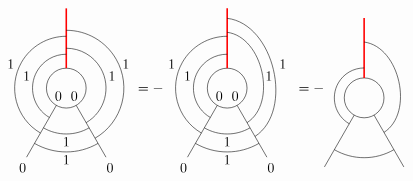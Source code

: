	\begin{equation*}
		\begin{tikzpicture}[scale=1,baseline=(current bounding box.center)]
			\draw (0,0) circle (0.5cm);
			\draw
			\foreach \a in {-60, -120} {
				(\a:0.5) -- (\a:2)
			};
			\draw[red,line width=0.4mm] (90:0.5) -- (90:2);
			\draw ([shift=(-60:1cm)]0,0) arc (-60:90:1cm);
			\draw ([shift=(-120:1.15cm)]0,0) arc (-120:-60:1.15cm);
			\draw ([shift=(240:0.85cm)]0,0) arc (240:90:0.85cm);
			\draw ([shift=(240:1.3cm)]0,0) arc (240:90:1.3cm);
			\draw ([shift=(-60:1.45cm)]0,0) arc (-60:90:1.45cm);
			\draw ([shift=(-120:1.6cm)]0,0) arc (-120:-60:1.6cm);
			\node at (0.2,-0.2) {$0$};
			\node at (-0.2,-0.2) {$0$};
			\node at (-1.1,-2) {$0$};
			\node at (1.1,-2) {$0$};
			\node at (-1,0.3) {$1$};
			\node at (1.15,0.3) {$1$};
			\node at (0,-1.35) {$1$};
			\node at (-1.4,0.6) {$1$};
			\node at (1.5,0.6) {$1$};
			\node at (0,-1.8) {$1$};
		\end{tikzpicture}
		=-\begin{tikzpicture}[scale=1,baseline=(current bounding box.center)]
			\draw (0,0) circle (0.5cm);
			\draw
			\foreach \a in {-60, -120} {
				(\a:0.5) -- (\a:2)
			};
			\draw[red,line width=0.4mm] (90:0.5) -- (90:2);
			\draw ([shift=(240:0.85cm)]0,0) arc (240:90:0.85cm);
			\draw ([shift=(-60:1cm)]0,0) to [bend right=70] ([shift=(90:1.4cm)]0,0);
			\draw ([shift=(-120:1.15cm)]0,0) arc (-120:-60:1.15cm);
			\draw ([shift=(240:1.3cm)]0,0) arc (240:90:1.3cm);
			\draw ([shift=(-60:1.4cm)]0,0) to [bend right=70] ([shift=(90:1.75cm)]0,0);
			\draw ([shift=(-120:1.6cm)]0,0) arc (-120:-60:1.6cm);
			\node at (0.2,-0.2) {$0$};
			\node at (-0.2,-0.2) {$0$};
			\node at (-1.1,-2) {$0$};
			\node at (1.1,-2) {$0$};
			\node at (-1,0.3) {$1$};
			\node at (1.05,0.3) {$1$};
			\node at (0,-1.35) {$1$};
			\node at (-1.4,0.6) {$1$};
			\node at (1.4,0.6) {$1$};
			\node at (0,-1.8) {$1$};
		\end{tikzpicture}
		=-\begin{tikzpicture}[scale=1,baseline=(current bounding box.center)]
			\draw (0,0) circle (0.5cm);
			\draw
			\foreach \a in {-60, -120} {
				(\a:0.5) -- (\a:2)
			};
			\draw[red,line width=0.4mm] (90:0.5) -- (90:2);
			\draw ([shift=(240:0.75cm)]0,0) arc (240:90:0.75cm);
			\draw ([shift=(-60:1cm)]0,0) to [bend right=70] ([shift=(90:1.4cm)]0,0);
			\draw ([shift=(-120:1.5cm)]0,0) arc (-120:-60:1.5cm);

\end{tikzpicture}
\end{equation*}
